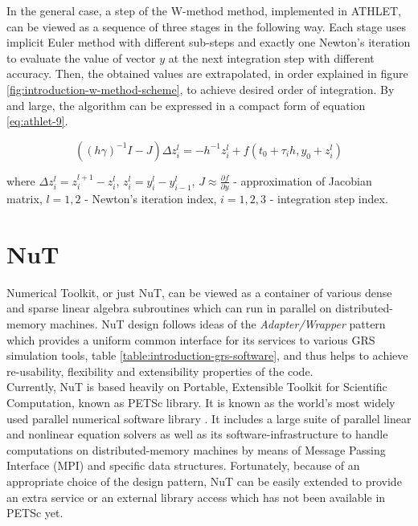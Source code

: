In the general case, a step of the W-method method, implemented in ATHLET, can be viewed as a sequence of three stages in the following way. Each stage uses implicit Euler method with different sub-steps  and exactly one Newton's iteration to evaluate the value of vector $y$ at the next integration step with different accuracy. Then, the obtained values are extrapolated, in order explained in figure \ref{fig:introduction-w-method-scheme}, to achieve desired order of integration. By and large, the algorithm can be expressed in a compact form of equation \ref{eq:athlet-9}.

\begin{equation} \label{eq:athlet-9}
	((h \gamma)^{-1}I - J) \Delta z^{l}_{i} = - h^{-1} z^{l}_{i} + f(t_0 + \tau_{i} h, y_{0} + z^{l}_{i})
\end{equation}

where $\Delta z^{l}_{i} = z^{l+1}_{i} - z^{l}_{i}$, $z^{l}_{i} = y^{l}_{i} - y^{l}_{i - 1}$, $J \approx \frac{\partial f}{\partial y}$ - approximation of Jacobian matrix, $l = 1,2$ - Newton's iteration index, $i = 1, 2, 3$ - integration step index.\\


\section{NuT}

Numerical Toolkit, or just NuT, can be viewed as a container of various dense and sparse linear algebra subroutines which can run in parallel on distributed-memory machines. NuT design follows ideas of the \textit{Adapter/Wrapper} pattern which provides a uniform common interface for its services to various GRS simulation tools, table \ref{table:introduction-grs-software}, and thus helps to achieve re-usability, flexibility and extensibility properties of the code.\\


Currently, NuT is based heavily on Portable, Extensible Toolkit for Scientific Computation, known as PETSc library. It is known as the world’s most widely used parallel numerical software  library \cite{wiki:petsc-general-info}. It includes a large suite of parallel linear and nonlinear equation solvers as well as its software-infrastructure to handle computations on distributed-memory machines by means of Message Passing Interface (MPI) and specific data structures. Fortunately, because of an appropriate choice of the design pattern, NuT can be easily extended to provide an extra service or an external library access which has not been available in PETSc yet.\\ 


